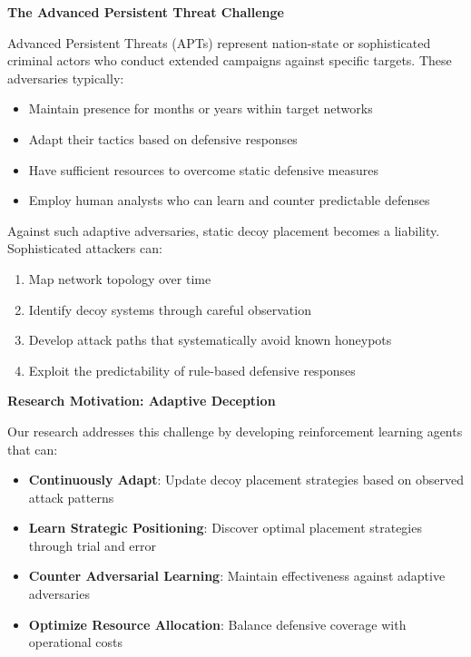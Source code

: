 \documentclass[12pt]{article}
\theoremstyle{definition}
\theoremstyle{plain}
\begin{document}
\textbf{The Advanced Persistent Threat Challenge}

Advanced Persistent Threats (APTs) represent nation-state or sophisticated criminal actors who conduct extended campaigns against specific targets. These adversaries typically:

\begin{itemize}
    \item Maintain presence for months or years within target networks
    \item Adapt their tactics based on defensive responses
    \item Have sufficient resources to overcome static defensive measures
    \item Employ human analysts who can learn and counter predictable defenses
\end{itemize}

Against such adaptive adversaries, static decoy placement becomes a liability. Sophisticated attackers can:
\begin{enumerate}
    \item Map network topology over time
    \item Identify decoy systems through careful observation
    \item Develop attack paths that systematically avoid known honeypots
    \item Exploit the predictability of rule-based defensive responses
\end{enumerate}

\textbf{Research Motivation: Adaptive Deception}

Our research addresses this challenge by developing reinforcement learning agents that can:

\begin{itemize}
    \item \textbf{Continuously Adapt}: Update decoy placement strategies based on observed attack patterns
    \item \textbf{Learn Strategic Positioning}: Discover optimal placement strategies through trial and error
    \item \textbf{Counter Adversarial Learning}: Maintain effectiveness against adaptive adversaries
    \item \textbf{Optimize Resource Allocation}: Balance defensive coverage with operational costs
\end{itemize}
\end{document}
